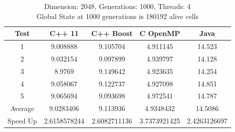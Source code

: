 \documentclass[11pt]{article} %
\begin{document}
\begin{table}[ht]

\caption{Dimension: 2048, Generations: 1000, Threads: 4\\Global State at 1000 generations is 180192 alive cells} %

\centering %

\begin{tabular}{c c c c c} %

\hline\hline %

Test & C++ 11 & C++ Boost & C OpenMP & Java \\ [0.5ex] %


\hline %

1 & 9.008888 & 9.105704 & 4.911145 & 14.523 \\
2 & 9.032154 & 9.097899 & 4.939797 & 14.128 \\
3 & 8.9769 & 9.149642 & 4.923635 & 14.254 \\
4 & 9.058067 & 9.122737 & 4.927098 & 14.851 \\
5 & 9.065694 & 9.093698 & 4.972541 & 14.787 \\
Average & 9.0283406 & 9.113936 & 4.9348432 & 14.5086 \\
Speed Up & 2.6158578244 & 2.6082711136 & 3.7373921425 & 2.4263126697 \\ [1ex]

\hline %

\end{tabular}
\end{table}
\pagebreak
\end{document}
